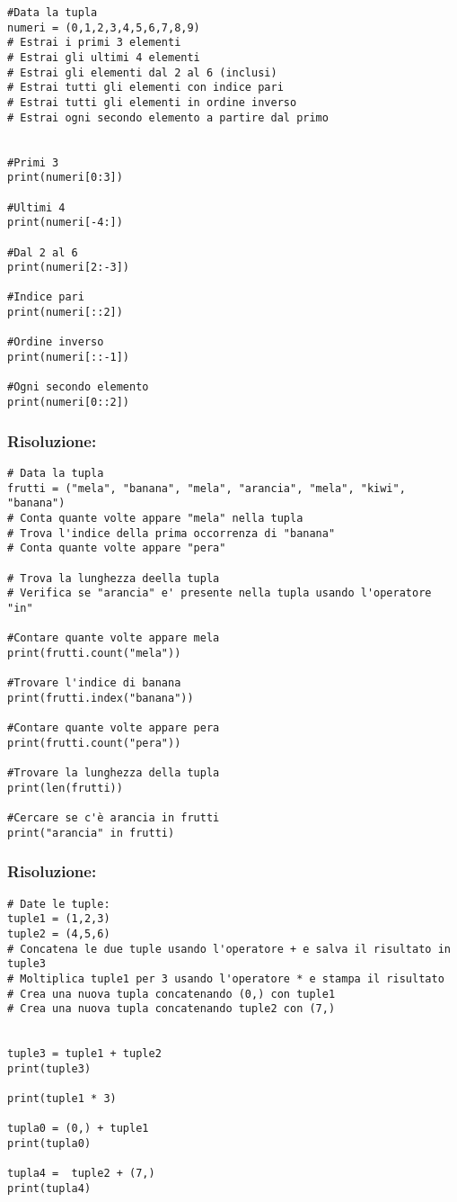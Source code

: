 \begin{lstlisting}
#Data la tupla
numeri = (0,1,2,3,4,5,6,7,8,9)
# Estrai i primi 3 elementi
# Estrai gli ultimi 4 elementi
# Estrai gli elementi dal 2 al 6 (inclusi)
# Estrai tutti gli elementi con indice pari
# Estrai tutti gli elementi in ordine inverso
# Estrai ogni secondo elemento a partire dal primo


#Primi 3
print(numeri[0:3])

#Ultimi 4
print(numeri[-4:])

#Dal 2 al 6
print(numeri[2:-3])

#Indice pari
print(numeri[::2])

#Ordine inverso
print(numeri[::-1])

#Ogni secondo elemento
print(numeri[0::2])
\end{lstlisting}


\subsubsection{Risoluzione: }

\begin{lstlisting}
# Data la tupla
frutti = ("mela", "banana", "mela", "arancia", "mela", "kiwi", "banana")
# Conta quante volte appare "mela" nella tupla
# Trova l'indice della prima occorrenza di "banana"
# Conta quante volte appare "pera"

# Trova la lunghezza deella tupla
# Verifica se "arancia" e' presente nella tupla usando l'operatore "in"

#Contare quante volte appare mela
print(frutti.count("mela"))

#Trovare l'indice di banana
print(frutti.index("banana"))

#Contare quante volte appare pera
print(frutti.count("pera"))

#Trovare la lunghezza della tupla
print(len(frutti))

#Cercare se c'è arancia in frutti
print("arancia" in frutti)
\end{lstlisting}


\subsubsection{Risoluzione: }

\begin{lstlisting}
# Date le tuple:
tuple1 = (1,2,3)
tuple2 = (4,5,6)
# Concatena le due tuple usando l'operatore + e salva il risultato in tuple3
# Moltiplica tuple1 per 3 usando l'operatore * e stampa il risultato
# Crea una nuova tupla concatenando (0,) con tuple1
# Crea una nuova tupla concatenando tuple2 con (7,)


tuple3 = tuple1 + tuple2
print(tuple3)

print(tuple1 * 3)

tupla0 = (0,) + tuple1
print(tupla0)

tupla4 =  tuple2 + (7,)
print(tupla4)

\end{lstlisting}

